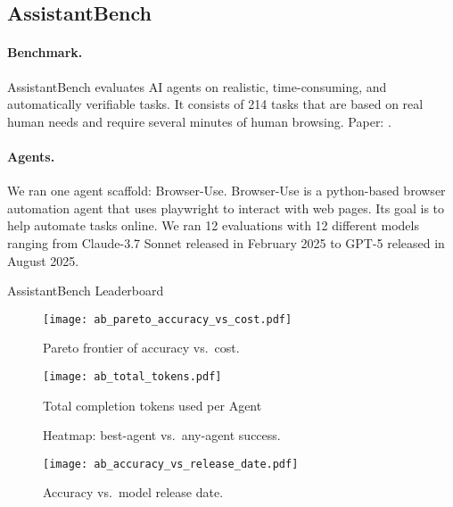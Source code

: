 \subsection{AssistantBench}\label{app:assistantbench}

\paragraph{Benchmark.}
AssistantBench evaluates AI agents on realistic, time-consuming, and automatically verifiable tasks. It consists of 214 tasks that are based on real human needs and require several minutes of human browsing.
Paper: \cite{assistantbench}.

\paragraph{Agents.}
We ran one agent scaffold: Browser-Use. Browser-Use is a python-based browser automation agent that uses playwright to interact with web pages. Its goal is to help automate tasks online. We ran 12 evaluations with 12 different models ranging from Claude-3.7 Sonnet released in February 2025 to GPT-5 released in August 2025.

\begin{table}[t]
  \centering
  \caption{AssistantBench Leaderboard}
  \label{tab:assistantbench_full}
  
\end{table}


\begin{figure}[htbp]
  \centering
  \texttt{[image: ab\_pareto\_accuracy\_vs\_cost.pdf]}
  \caption{Pareto frontier of accuracy vs.\ cost.}
  \label{fig:ab_pareto}
\end{figure}

\begin{figure}[htbp]
  \centering
  \texttt{[image: ab\_total\_tokens.pdf]}
  \caption{Total completion tokens used per Agent}
  \label{fig:ab_tokens}
\end{figure}

\begin{figure*}[t]
  \centering
  \caption{Heatmap: best-agent vs.\ any-agent success.}
  \label{fig:ab_heatmap}
\end{figure*}

\begin{figure}[htbp]
  \centering
  \texttt{[image: ab\_accuracy\_vs\_release\_date.pdf]}
  \caption{Accuracy vs.\ model release date.}
  \label{fig:ab_release}
\end{figure}

\clearpage